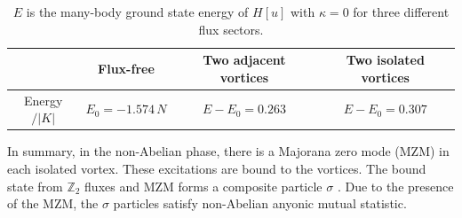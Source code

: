 

\begin{table}[t]
    \centering
    \begin{tabular}{|c||c|c|c|}\hline
       &  Flux-free & Two adjacent vortices \cite{Panigrahi_2023} & Two isolated vortices %
       \\
        \hline
       Energy$/|K|$    %
       & $E_0=-1.574 \, N$ &  $E-E_0=0.263$ & $E-E_0=0.307$ \\ \hline
    \end{tabular}
    \caption{$E$ is the many-body ground state energy of $H[u]$ with  $\kappa=0$ for three different flux sectors. }
    \label{tab:I-1-en}
\end{table}





In summary,  in the non-Abelian phase, there is a Majorana zero mode (MZM) in each isolated vortex.
These excitations are bound to the vortices.
The bound state from $\mathbb{Z}_2$ fluxes and MZM forms a composite particle %
$\sigma$ \cite{Kitaev2006}.
Due to the presence of the MZM, the $\sigma$ particles satisfy non-Abelian anyonic mutual statistic.



